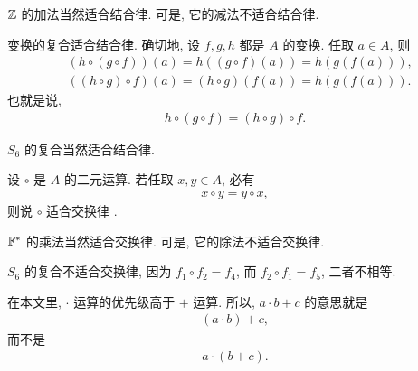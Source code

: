 \begin{example}
    $\mathbb{Z}$ 的加法当然适合结合律. 可是, 它的减法不适合结合律.
\end{example}

\begin{remark}
    变换的复合适合结合律. 确切地, 设 $f,g,h$ 都是 $A$ 的变换. 任取 $a \in A$, 则
    \begin{align*}
         & (h \circ (g \circ f))(a) = h((g \circ f)(a)) = h(g(f(a))), \\
         & ((h \circ g) \circ f)(a) = (h \circ g)(f(a)) = h(g(f(a))).
    \end{align*}
    也就是说,
    \begin{align*}
        h \circ (g \circ f) = (h \circ g) \circ f.
    \end{align*}
\end{remark}

\begin{example}
    $S_6$ 的复合当然适合结合律.
\end{example}

\begin{definition}
    设 $\circ$ 是 $A$ 的二元运算. 若任取 $x,y \in A$, 必有
    \begin{align*}
        x \circ y = y \circ x,
    \end{align*}
    则说 $\circ$ 适合交换律 .
\end{definition}

\begin{example}
    $\mathbb{F}^{\ast}$ 的乘法当然适合交换律. 可是, 它的除法不适合交换律.
\end{example}

\begin{example}
    $S_6$ 的复合不适合交换律, 因为 $f_1 \circ f_2 = f_4$, 而 $f_2 \circ f_1 = f_5$, 二者不相等.
\end{example}

\begin{remark}
    在本文里, $\cdot$ 运算的优先级高于 $+$ 运算. 所以, $a \cdot b + c$ 的意思就是
    \begin{align*}
        (a \cdot b) + c,
    \end{align*}
    而不是
    \begin{align*}
        a \cdot (b + c).
    \end{align*}
\end{remark}

